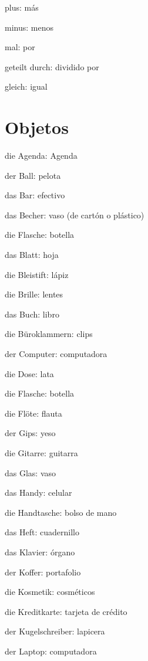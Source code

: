 \begin{multicols}{3}
\begin{myitemize}
\item plus: más
\item minus: menos
\item mal: por
\item geteilt durch: dividido por
\item gleich: igual
\end{myitemize}
\end{multicols}


\section{Objetos}
\begin{multicols}{3}
\begin{myitemize}
\item die Agenda: Agenda
\item der Ball: pelota
\item das Bar: efectivo
\item das Becher: vaso (de cartón o plástico)
\item die Flasche: botella
\item das Blatt: hoja
\item die Bleistift: lápiz
\item die Brille: lentes
\item das Buch: libro
\item die Büroklammern: clips
\item der Computer: computadora
\item die Dose: lata
\item die Flasche: botella
\item die Flöte: flauta
\item der Gips: yeso
\item die Gitarre: guitarra
\item das Glas: vaso
\item das Handy: celular
\item die Handtasche: bolso de mano
\item das Heft: cuadernillo
\item das Klavier: órgano
\item der Koffer: portafolio
\item die Kosmetik: cosméticos
\item die Kreditkarte: tarjeta de crédito
\item der Kugelschreiber: lapicera
\item der Laptop: computadora

\end{myitemize}
\end{multicols}
